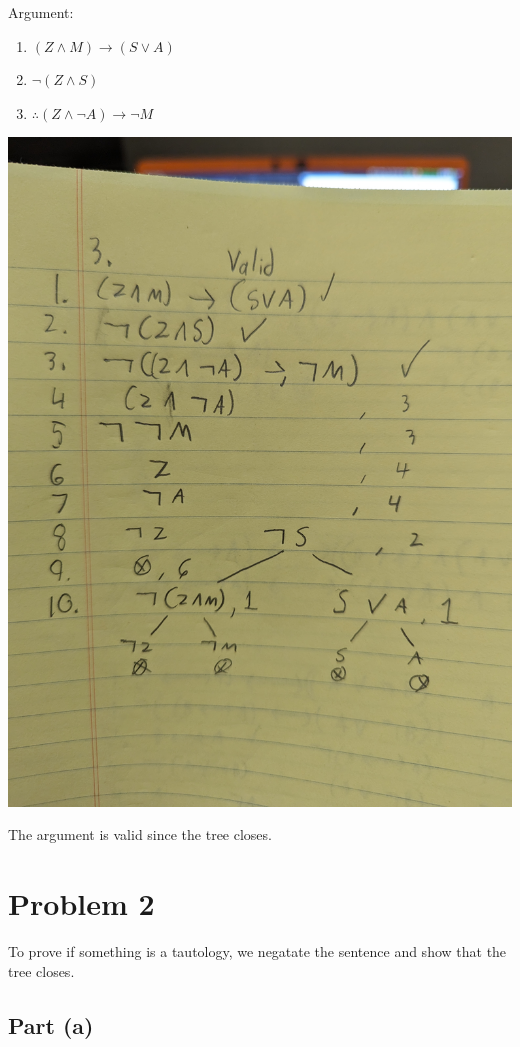 \documentclass[12pt]{article}
\begin{document}
Argument:
\begin{enumerate}
    \item $(Z \land M) \rightarrow (S \lor A)$
    \item $\lnot (Z \land S)$
    \item $\therefore (Z \land \lnot A) \rightarrow \lnot M$
\end{enumerate}

\includegraphics[width=\textwidth]{1c}

The argument is valid since the tree closes.

\section*{Problem 2}

To prove if something is a tautology, we negatate the sentence and show that the tree closes. 

\subsection*{Part (a)}
\end{document}

